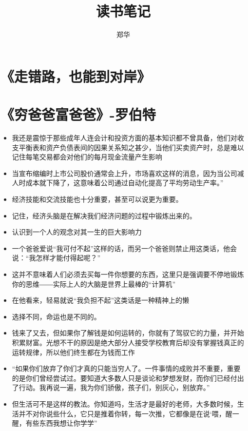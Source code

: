 \documentclass[UTF8,a4paper,8pt]{ctexart}
\author{郑华}
\title{读书笔记}
\begin{document}
 	\maketitle
 	\tableofcontents
 	
 \section{《走错路，也能到对岸》 }
 
 \newpage
 \section{《穷爸爸富爸爸》-罗伯特 }
 \begin{itemize}
 	\item 我还是震惊于那些成年人连会计和投资方面的基本知识都不曾具备，他们对收支平衡表和资产负债表间的因果关系知之甚少，当他们买卖资产时，总是难以记住每笔交易都会对他们的每月现金流量产生影响
 	\item 当宣布缩编时上市公司股价通常会上升，市场喜欢这样的消息，因为当公司减人时成本就下降了，这意味着公司通过自动化提高了平均劳动生产率。”
 	\item 经济技能和交流技能也十分重要，甚至可以说更为重要。
 	\item 记住，经济头脑是在解决我们经济问题的过程中锻炼出来的。
 	\item 认识到一个人的观念对其一生的巨大影响力
 	\item 一个爸爸爱说“我可付不起”这样的话，而另一个爸爸则禁止用这类话，他会说：“我怎样才能付得起呢？”
 	\item 这并不意味着人们必须去买每一件你想要的东西，这里只是强调要不停地锻炼你的思维――实际上人的大脑是世界上最棒的“计算机”
 	\item 在他看来，轻易就说“我负担不起”这类话是一种精神上的懒
 	\item 选择不同，命运也是不同的。
 	\item 钱来了又去，但如果你了解钱是如何运转的，你就有了驾驭它的力量，并开始积累财富。光想不干的原因是绝大部分人接受学校教育后却没有掌握钱真正的运转规律，所以他们终生都在为钱而工作
 	\item “如果你们放弃了你们才真的只能当穷人了。一件事情的成败并不重要，重要的是你们曾经尝试过。要知道大多数人只是谈论和梦想发财，而你们已经付出了行动。我再说一遍，我为你们骄傲，孩子们，别灰心，别放弃。”
 	\item 但生活可不是这样的教法。你知道吗，生活才是最好的老师，大多数时候，生活并不对你说些什么，它只是推着你转，每一次推，它都像是在说‘喂，醒一醒，有些东西我想让你学学”

\end{itemize}
\end{document}
